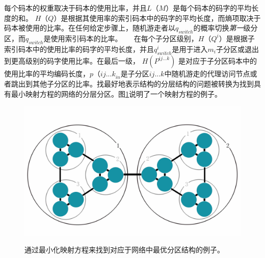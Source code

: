 每个码本的权重取决于码本的使用比率，并且$ L（M）$是每个码本的码字的平均长度的和。 $ H（Q）$是根据其使用率的索引码本中的码字的平均长度，而熵项取决于码本被使用的比率。在任何给定步骤上，随机游走者以$ q_ {switch} $的概率切换\emph {第一}级分区，而$ q_ {switch} $是使用索引码本的比率。
  
在每个子分区级别，$ H（Q ^ i）$是根据子索引码本中的使用比率的码字的平均长度，并且$ q_ {switch} ^ i $是用于进入$ m_i $子分区或退出到更高级别的码字使用比率。在最后一级， $H(P^{ij...k})$ 是对应于子分区码本中的使用比率的平均编码长度，$ p（{ij ... k} _ {in} $是子分区$ij...k$中随机游走的代理访问节点或者跳出到其他子分区的比率。找最好地表示结构的分层结构的问题被转换为找到具有最小映射方程的网络的分层分区。图\ref{fig:mapequation}说明了一个映射方程的例子。
\begin{figure}[!h]
\centering
  \includegraphics[width=1.0\textwidth]{./graph/mapequationJPG.jpg}\\
  \caption{通过最小化映射方程来找到对应于网络中最优分区结构的例子。}
\label{fig:mapequation}
\end{figure}

